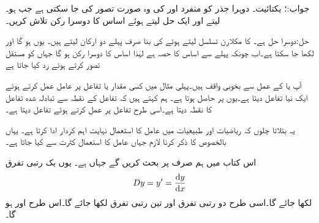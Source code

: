 جواب:؛ یکتائیت۔ 
دوہرا جذر کو منفرد  اور  کی وہ صورت تصور کی جا سکتی ہے جب  ہو۔ لیتے اور ایک حل  لیتے ہوئے اساس کا دوسرا رکن   تلاش کریں۔

حل:دوسرا حل  ہے۔ کا مکلارن تسلسل لیتے ہوئے  کی بنا صرف پہلے دو ارکان لیتے ہیں۔
یوں   ہو گا اور 
 لکھا جا سکتا ہے۔اب چونکہ  پہلے سے اساس کا حصہ ہے لہٰذا اساس کا دوسرا رکن  ہو گا جہاں  کو مستقل تصور کرتے ہوئے رد کیا جاتا ہے

آپ  یا  کے عمل سے بخوبی واقف ہیں۔پہلی مثال میں کسی مقدار یا تفاعل  پر عامل  عمل کرتے ہوئے ایک نیا تفاعل دیتا ہے۔یوں  پر  حاصل ہوتا ہے۔ ہم کہتے ہیں کہ   تفاعل  کے نقطہ  سے تبادلہ شدہ  تفاعل  کا نقطہ  دیتا ہے۔اسی طرح   تفاعل  پر عمل کرتے ہوئے تفاعل  دیتا ہے۔

یہ بتلاتا چلوں کہ ریاضیات اور طبیعیات میں عامل کا استعمال نہایت اہم کردار ادا کرتا ہے۔ یہاں بالخصوص  کا ذکر کرنا لازم جہاں عامل کا استعمال کثرت سے کیا جاتا ہے۔ 

اس کتاب میں ہم صرف   پر بحث کریں گے جہاں  ہے۔ یوں یک رتبی تفرق
\begin{align}
Dy=y'=\frac{\dif y}{\dif x}
\end{align}
لکھا جائے گا۔اسی طرح دو رتبی تفرق  اور تین رتبی تفرق  لکھا جائے گا۔اس طرح  اور  ہو گا۔

